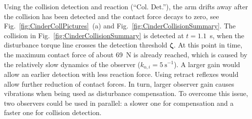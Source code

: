 Using the collision detection and reaction (``Col. Det.''), the arm drifts away after the collision has been detected and the contact force decays to zero, see Fig.~\ref{fig:CinderCollPictures}~(a) and Fig.~\ref{fig:CinderCollisionSummary}.
The collision in Fig.~\ref{fig:CinderCollisionSummary} is detected at $t=1.1$~s, when the disturbance torque line crosses the detection threshold $\bm{\zeta}$.
At this point in time, the maximum contact force of about 69~N is already reached, which is caused by the relatively slow dynamics of the observer (\mbox{$k_{\mathrm{o},i}=5~\mathrm{s}^{-1}$}).
A larger gain would allow an earlier detection with less reaction force.
Using retract reflexes would allow further reduction of contact forces.
In turn, larger observer gain causes vibrations when being used as disturbance compensation.
To overcome this issue, two observers could be used in parallel: a slower one for compensation and a faster one for collision detection.

